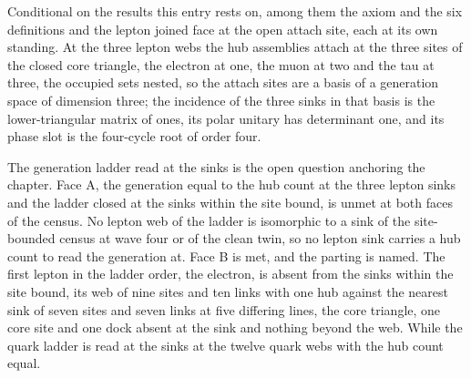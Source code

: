 \begin{chconditional}\label{box:VIII-4-three-generations-as-attach-sites:4}
Conditional on the results this entry rests on, among them the axiom and the six definitions and the lepton joined face at the open attach site, each at its own standing. At the three lepton webs the hub assemblies attach at the three sites of the closed core triangle, the electron at one, the muon at two and the tau at three, the occupied sets nested, so the attach sites are a basis of a generation space of dimension three; the incidence of the three sinks in that basis is the lower-triangular matrix of ones, its polar unitary has determinant one, and its phase slot is the four-cycle root of order four.
\end{chconditional}
\begin{chwall}\label{box:VIII-4-three-generations-as-attach-sites:5}
The generation ladder read at the sinks is the open question anchoring the chapter. Face A, the generation equal to the hub count at the three lepton sinks and the ladder closed at the sinks within the site bound, is unmet at both faces of the census. No lepton web of the ladder is isomorphic to a sink of the site-bounded census at wave four or of the clean twin, so no lepton sink carries a hub count to read the generation at. Face B is met, and the parting is named. The first lepton in the ladder order, the electron, is absent from the sinks within the site bound, its web of nine sites and ten links with one hub against the nearest sink of seven sites and seven links at five differing lines, the core triangle, one core site and one dock absent at the sink and nothing beyond the web. While the quark ladder is read at the sinks at the twelve quark webs with the hub count equal.
\end{chwall}
